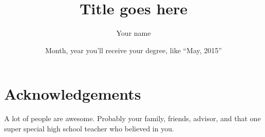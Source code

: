\documentclass[letterpaper,12pt]{yalephd}
\title{Title goes here}
\author{Your name}
\date{Month, year you'll receive your degree, like ``May, 2015''} %
\begin{document}
\frontmatter

\begin{abstract}
\end{abstract}

\maketitle
\makecopyright{\printyear} %
\tableofcontents
\listoffigures %
\listoftables %


\chapter{Acknowledgements} %
A lot of people are awesome. Probably your family, friends, 
advisor, and that one super special high school teacher who
believed in you.

\mainmatter






\appendix





\backmatter


\end{document}
